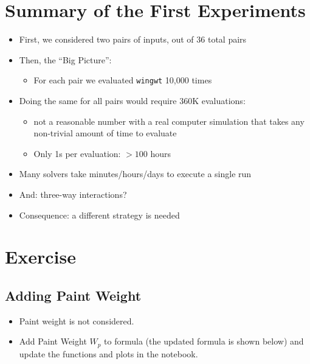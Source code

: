 \documentclass[
  letterpaper,
  DIV=11,
  numbers=noendperiod]{scrreprt}
\providecommand{\tightlist}{%
  \setlength{\itemsep}{0pt}\setlength{\parskip}{0pt}}\usepackage{longtable,booktabs,array}
\begin{document}
\hypertarget{summary-of-the-first-experiments}{%
\section{Summary of the First
Experiments}\label{summary-of-the-first-experiments}}

\begin{itemize}
\tightlist
\item
  First, we considered two pairs of inputs, out of 36 total pairs
\item
  Then, the ``Big Picture'':

  \begin{itemize}
  \tightlist
  \item
    For each pair we evaluated \texttt{wingwt} 10,000 times
  \end{itemize}
\item
  Doing the same for all pairs would require 360K evaluations:

  \begin{itemize}
  \tightlist
  \item
    not a reasonable number with a real computer simulation that takes
    any non-trivial amount of time to evaluate
  \item
    Only 1s per evaluation: \(>100\) hours
  \end{itemize}
\item
  Many solvers take minutes/hours/days to execute a single run
\item
  And: three-way interactions?
\item
  Consequence: a different strategy is needed
\end{itemize}

\hypertarget{exercise}{%
\section{Exercise}\label{exercise}}

\hypertarget{adding-paint-weight}{%
\subsection{Adding Paint Weight}\label{adding-paint-weight}}

\begin{itemize}
\tightlist
\item
  Paint weight is not considered.
\item
  Add Paint Weight \(W_p\) to formula (the updated formula is shown
  below) and update the functions and plots in the notebook.
\end{itemize}
\end{document}
